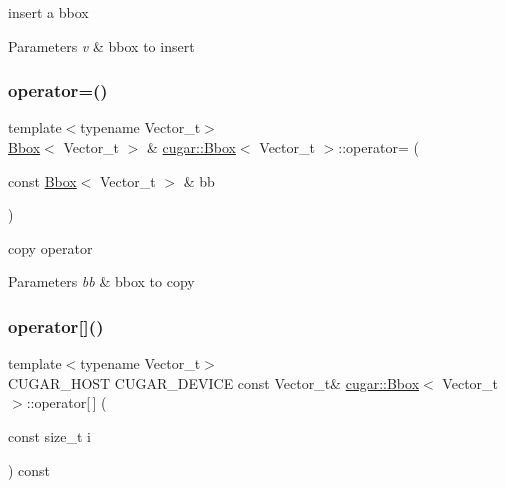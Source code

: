 insert a bbox


\begin{DoxyParams}{Parameters}
{\em v} & bbox to insert \\
\hline
\end{DoxyParams}
\mbox{\label{structcugar_1_1_bbox_a2e82040a0dd47a328ffdf011553e40e0}} 
\subsubsection{\texorpdfstring{operator=()}{operator=()}}
{\footnotesize\ttfamily template$<$typename Vector\+\_\+t$>$ \\
\hyperlink{structcugar_1_1_bbox}{Bbox}$<$ Vector\+\_\+t $>$ \& \hyperlink{structcugar_1_1_bbox}{cugar\+::\+Bbox}$<$ Vector\+\_\+t $>$\+::operator= (\begin{DoxyParamCaption}\item[{const \hyperlink{structcugar_1_1_bbox}{Bbox}$<$ Vector\+\_\+t $>$ \&}]{bb }\end{DoxyParamCaption})}

copy operator


\begin{DoxyParams}{Parameters}
{\em bb} & bbox to copy \\
\hline
\end{DoxyParams}
\mbox{\label{structcugar_1_1_bbox_aca0124ac5cae61c1b3c8885a6e0eab47}} 
\subsubsection{\texorpdfstring{operator[]()}{operator[]()}\hspace{0.1cm}{\footnotesize\ttfamily [1/2]}}
{\footnotesize\ttfamily template$<$typename Vector\+\_\+t$>$ \\
C\+U\+G\+A\+R\+\_\+\+H\+O\+ST C\+U\+G\+A\+R\+\_\+\+D\+E\+V\+I\+CE const Vector\+\_\+t\& \hyperlink{structcugar_1_1_bbox}{cugar\+::\+Bbox}$<$ Vector\+\_\+t $>$\+::operator\mbox{[}$\,$\mbox{]} (\begin{DoxyParamCaption}\item[{const size\+\_\+t}]{i }\end{DoxyParamCaption}) const\hspace{0.3cm}{\ttfamily [inline]}}

